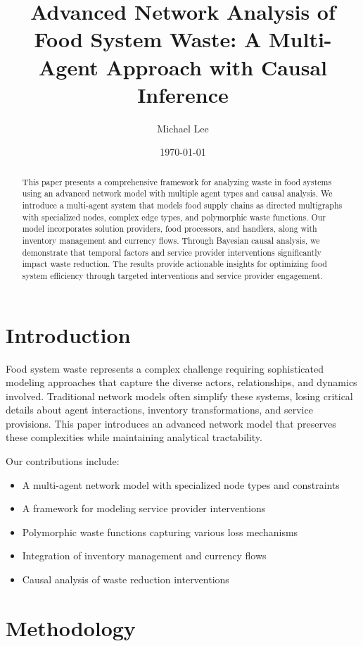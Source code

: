 \documentclass[12pt]{article}
\title{Advanced Network Analysis of Food System Waste: A Multi-Agent Approach with Causal Inference}
\author{Michael Lee}
\date{\today}
\theoremstyle{definition}
\begin{document}
\maketitle

\begin{abstract}
This paper presents a comprehensive framework for analyzing waste in food systems using an advanced network model with multiple agent types and causal analysis. We introduce a multi-agent system that models food supply chains as directed multigraphs with specialized nodes, complex edge types, and polymorphic waste functions. Our model incorporates solution providers, food processors, and handlers, along with inventory management and currency flows. Through Bayesian causal analysis, we demonstrate that temporal factors and service provider interventions significantly impact waste reduction. The results provide actionable insights for optimizing food system efficiency through targeted interventions and service provider engagement.
\end{abstract}

\section{Introduction}
Food system waste represents a complex challenge requiring sophisticated modeling approaches that capture the diverse actors, relationships, and dynamics involved. Traditional network models often simplify these systems, losing critical details about agent interactions, inventory transformations, and service provisions. This paper introduces an advanced network model that preserves these complexities while maintaining analytical tractability.

Our contributions include:
\begin{itemize}
    \item A multi-agent network model with specialized node types and constraints
    \item A framework for modeling service provider interventions
    \item Polymorphic waste functions capturing various loss mechanisms
    \item Integration of inventory management and currency flows
    \item Causal analysis of waste reduction interventions
\end{itemize}

\section{Methodology}
\end{document}
